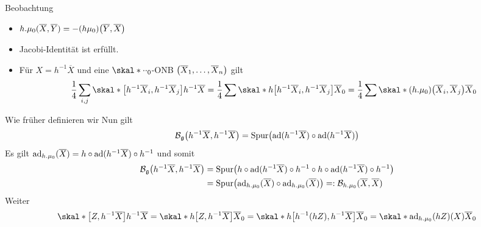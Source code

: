 Beobachtung
\begin{itemize}
	\item $h . \mu_0 (\overline{X},\overline{Y}) = - (h \mu_0) \enbrace*{\overline{Y},\overline{X}}$
	\item Jacobi-Identität ist erfüllt.
	\item Für $X = h^{-1} \overline{X}$ und eine $\skal*{\cdot }{\cdot }_0$-ONB $\enbrace*{\overline{X}_1,\ldots ,\overline{X}_n}$ gilt 
	\begin{align}
		\frac{1}{4} \sum_{i,j} \skal*{\benbrace*{h^{-1} \overline{X}_i, h^{-1} \overline{X}_j}}{h^{-1} \overline{X}} = \frac{1}{4} \sum \skal*{h \benbrace*{h^{-1} \overline{X}_i, h^{-1} \overline{X}_j}}{\overline{X}}_0 
		= \frac{1}{4}\sum \skal*{(h.\mu_0) \enbrace*{\overline{X}_i, \overline{X}_j}}{\overline{X}}_0
	\end{align}
\end{itemize}
Wie früher definieren wir
Nun gilt
\[
	\mathcal{B}_\mathfrak{g} \enbrace*{h^{-1} \overline{X}, h^{-1} \overline{X}} = \Spur \enbrace*{\ad(h^{-1} \overline{X}) \circ \ad(h^{-1} \overline{X})}
\]
Es gilt $\ad_{h.\mu_0}(\overline{X}) = h \circ \ad(h^{-1} \overline{X}) \circ h^{-1}$ und somit
\begin{align}
	\mathcal{B}_\mathfrak{g} \enbrace*{h^{-1} \overline{X}, h^{-1} \overline{X}} &= \Spur \enbrace*{h \circ  \ad(h^{-1}\overline{X}) \circ h^{-1} \circ h \circ \ad(h^{-1} \overline{X}) \circ h^{-1}} \\
	&= \Spur \enbrace*{\ad_{h.\mu_0}(\overline{X}) \circ \ad_{h.\mu_0}(\overline{X})} =: \mathcal{B}_{h.\mu_0}(\overline{X},\overline{X})
\end{align}
Weiter
\begin{align}
	\skal*{\benbrace*{Z, h^{-1} \overline{X}}}{h^{-1} \overline{X}} = \skal*{h \benbrace*{Z,h^{-1} \overline{X}}}{\overline{X}}_0 = \skal*{h \benbrace*{h^{-1}(hZ), h^{-1} \overline{X}}}{\overline{X}}_0 = \skal*{\ad_{h.\mu_0}(hZ)(X)}{\overline{X}}_0
\end{align}

